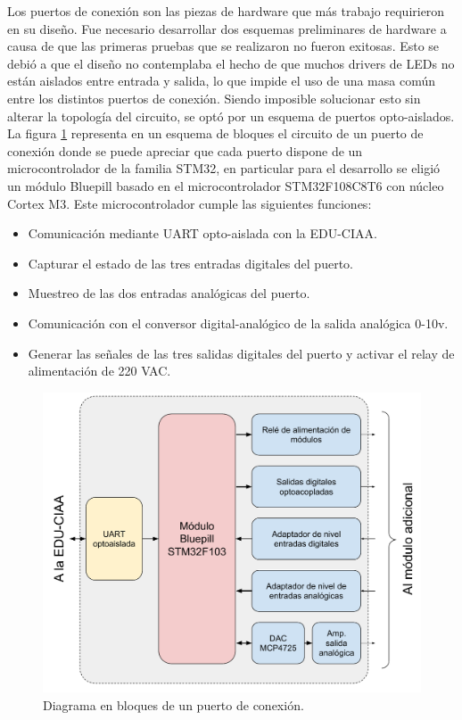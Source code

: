 Los puertos de conexión son las piezas de hardware que más trabajo requirieron en su diseño. Fue necesario desarrollar dos esquemas preliminares de hardware a causa de que las primeras pruebas que se realizaron no fueron exitosas. Esto se debió a que el diseño no contemplaba el hecho de que muchos drivers de LEDs no están aislados entre entrada y salida, lo que impide el uso de una masa común entre los distintos puertos de conexión. Siendo imposible solucionar esto sin alterar la topología del circuito, se optó por un esquema de puertos opto-aislados. La figura \ref{fig:BloquesPuerto} representa en un esquema de bloques el circuito de un puerto de conexión donde se puede apreciar que cada puerto dispone de un microcontrolador de la familia STM32, en particular para el desarrollo se eligió un módulo Bluepill basado en el microcontrolador STM32F108C8T6 con núcleo Cortex M3. Este microcontrolador cumple las siguientes funciones:

\begin{itemize}
	\item Comunicación mediante UART opto-aislada con la EDU-CIAA.
	\item Capturar el estado de las tres entradas digitales del puerto.
	\item Muestreo de las dos entradas analógicas del puerto.
	\item Comunicación con el conversor digital-analógico de la salida analógica 0-10v.
	\item Generar las señales de las tres salidas digitales del puerto y activar el relay de alimentación de 220 VAC.
\end{itemize}

\begin{figure}[ht]
	\centering
	\includegraphics[width=1\textwidth]{./Figures/BloquesPuerto.pdf}
	\caption{Diagrama en bloques de un puerto de conexión.}
	\label{fig:BloquesPuerto}
\end{figure}


